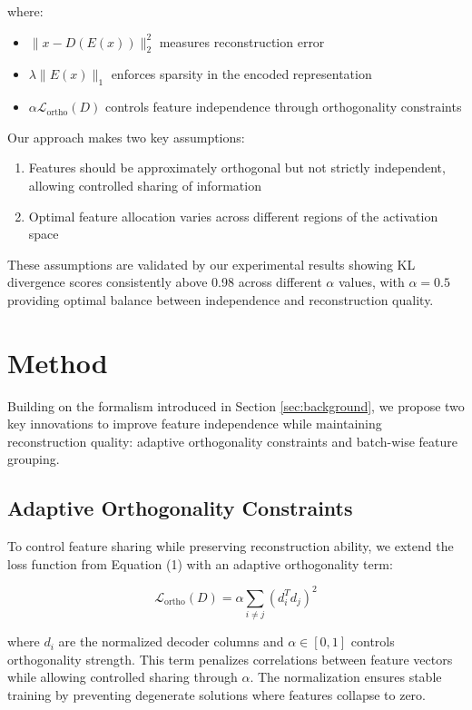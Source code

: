 \documentclass{article} %
\begin{document}
where:
\begin{itemize}
\item $\|x - D(E(x))\|_2^2$ measures reconstruction error
\item $\lambda \|E(x)\|_1$ enforces sparsity in the encoded representation
\item $\alpha \mathcal{L}_{\text{ortho}}(D)$ controls feature independence through orthogonality constraints
\end{itemize}

Our approach makes two key assumptions:
\begin{enumerate}
\item Features should be approximately orthogonal but not strictly independent, allowing controlled sharing of information
\item Optimal feature allocation varies across different regions of the activation space
\end{enumerate}

These assumptions are validated by our experimental results showing KL divergence scores consistently above 0.98 across different $\alpha$ values, with $\alpha=0.5$ providing optimal balance between independence and reconstruction quality.

\section{Method}
\label{sec:method}

Building on the formalism introduced in Section \ref{sec:background}, we propose two key innovations to improve feature independence while maintaining reconstruction quality: adaptive orthogonality constraints and batch-wise feature grouping.

\subsection{Adaptive Orthogonality Constraints}
To control feature sharing while preserving reconstruction ability, we extend the loss function from Equation (1) with an adaptive orthogonality term:

\begin{equation}
\mathcal{L}_{\text{ortho}}(D) = \alpha \sum_{i \neq j} (d_i^T d_j)^2
\label{eq:ortho_loss}
\end{equation}

where $d_i$ are the normalized decoder columns and $\alpha \in [0,1]$ controls orthogonality strength. This term penalizes correlations between feature vectors while allowing controlled sharing through $\alpha$. The normalization ensures stable training by preventing degenerate solutions where features collapse to zero.
\end{document}
